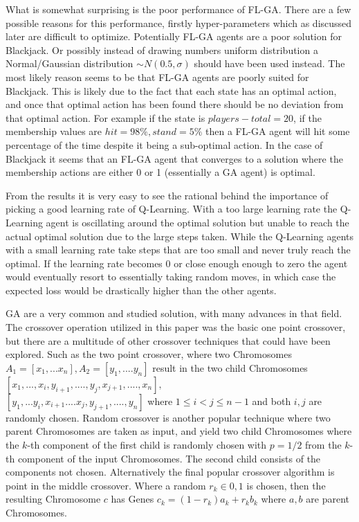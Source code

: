 \documentclass[10pt, a4paper, twocolumn]{article}
\begin{document}
What is somewhat surprising is the poor performance of FL-GA. There are a few possible reasons for this performance, firstly hyper-parameters which as discussed later are difficult to optimize. Potentially FL-GA agents are a poor solution for Blackjack. Or possibly instead of drawing numbers uniform distribution a Normal/Gaussian distribution $\sim N(0.5, \sigma)$ should have been used instead. The most likely reason seems to be that FL-GA agents are poorly suited for Blackjack. This is likely due to the fact that each state has an optimal action, and once that optimal action has been found there should be no deviation from that optimal action. For example if the state is $players-total = 20$, if the membership values are $hit = 98\%, stand = 5\%$ then a FL-GA agent will hit some percentage of the time despite it being a sub-optimal action. In the case of Blackjack it seems that an FL-GA agent that converges to a solution where the membership actions are either 0 or 1 (essentially a GA agent) is optimal. 

From the results it is very easy to see the rational behind the importance of picking a good learning rate of Q-Learning. With a too large learning rate the Q-Learning agent is oscillating around the optimal solution but unable to reach the actual optimal solution due to the large steps taken. While the Q-Learning agents with a small learning rate take steps that are too small and never truly reach the optimal. If the learning rate becomes 0 or close enough enough to zero the agent would eventually resort to essentially taking random moves, in which case the expected loss would be drastically higher than the other agents.

GA are a very common and studied solution, with many advances in that field. The crossover operation utilized in this paper was the basic one point crossover, but there are a multitude of other crossover techniques that could have been explored. Such as the two point crossover, where two Chromosomes $A_1 = [x_1, ... x_n], A_2 = [y_1, .... y_n]$ result in the two child Chromosomes $[x_1, ... , x_i, y_{i+1}, .... , y_j, x_{j+1}, .... ,x_n],$\\$ [y_1, ... y_i, x_{i+1} .... x_j, y_{j+1}, .... , y_n]$ where $1 \leq i < j \leq n - 1$ and both $i, j$ are randomly chosen. Random crossover is another popular technique where two parent Chromosomes are taken as input, and yield two child Chromosomes where the $k$-th component of the first child is randomly chosen with $p = 1/2$ from the $k$-th component of the input Chromosomes. The second child consists of the components not chosen. Alternatively the final popular crossover algorithm is point in the middle crossover. Where a random $r_k \in {0, 1}$ is chosen, then the resulting Chromosome $c$ has Genes $c_k = (1 - r_k)a_k + r_kb_k$ where $a,b$ are parent Chromosomes. 
\end{document}

